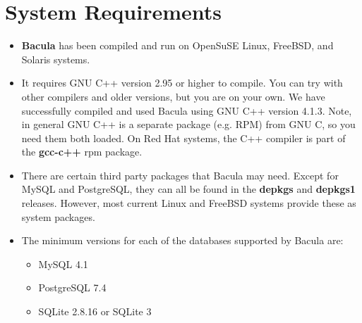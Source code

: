 
\chapter{System Requirements}
\label{SysReqs}

\begin{itemize}
\item {\bf Bacula} has been compiled and run on OpenSuSE Linux, FreeBSD, and
   Solaris systems. 
\item It requires GNU C++ version 2.95 or higher to compile. You can try  with
   other compilers and older versions, but you are on your own.  We have
   successfully compiled and used Bacula using GNU C++ version 4.1.3.
   Note, in general GNU C++ is a separate package (e.g.  RPM) from GNU C, so you
   need them both loaded. On Red Hat systems, the C++ compiler is part of the
   {\bf gcc-c++} rpm package. 
\item There are certain third party packages that Bacula may need.  Except for
   MySQL and PostgreSQL, they can all be found in the  {\bf depkgs} and {\bf
   depkgs1} releases. However, most current Linux and FreeBSD systems
   provide these as system packages.
\item The minimum versions for each of the databases supported by Bacula
   are:

   \begin{itemize}
   \item MySQL 4.1
   \item PostgreSQL 7.4
   \item SQLite 2.8.16 or SQLite 3
   \end{itemize}


\end{itemize}

